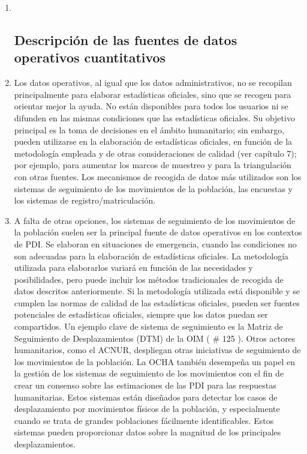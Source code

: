 \documentclass[
]{book}
\begin{document}
\begin{enumerate}
\def\labelenumi{\arabic{enumi}.}
\item ~
  \hypertarget{descripciuxf3n-de-las-fuentes-de-datos-operativos-cuantitativos}{%
  \subsection{Descripción de las fuentes de datos operativos cuantitativos}\label{descripciuxf3n-de-las-fuentes-de-datos-operativos-cuantitativos}}
\item
  Los datos operativos, al igual que los datos administrativos, no se recopilan principalmente para elaborar estadísticas oficiales, sino que se recogen para orientar mejor la ayuda. No están disponibles para todos los usuarios ni se difunden en las mismas condiciones que las estadísticas oficiales. Su objetivo principal es la toma de decisiones en el ámbito humanitario; sin embargo, pueden utilizarse en la elaboración de estadísticas oficiales, en función de la metodología empleada y de otras consideraciones de calidad (ver capítulo 7); por ejemplo, para aumentar los marcos de muestreo y para la triangulación con otras fuentes. Los mecanismos de recogida de datos más utilizados son los sistemas de seguimiento de los movimientos de la población, las encuestas y los sistemas de registro/matriculación.
\item
  A falta de otras opciones, los sistemas de seguimiento de los movimientos de la población suelen ser la principal fuente de datos operativos en los contextos de PDI. Se elaboran en situaciones de emergencia, cuando las condiciones no son adecuadas para la elaboración de estadísticas oficiales. La metodología utilizada para elaborarlos variará en función de las necesidades y posibilidades, pero puede incluir los métodos tradicionales de recogida de datos descritos anteriormente. Si la metodología utilizada está disponible y se cumplen las normas de calidad de las estadísticas oficiales, pueden ser fuentes potenciales de estadísticas oficiales, siempre que los datos puedan ser compartidos. Un ejemplo clave de sistema de seguimiento es la Matriz de Seguimiento de Desplazamientos (DTM) de la OIM (
  \# 125
  ). Otros actores humanitarios, como el ACNUR, despliegan otras iniciativas de seguimiento de los movimientos de la población. La OCHA también desempeña un papel en la gestión de los sistemas de seguimiento de los movimientos con el fin de crear un consenso sobre las estimaciones de las PDI para las respuestas humanitarias. Estos sistemas están diseñados para detectar los casos de desplazamiento por movimientos físicos de la población, y especialmente cuando se trata de grandes poblaciones fácilmente identificables. Estos sistemas pueden proporcionar datos sobre la magnitud de los principales desplazamientos.

\end{enumerate}
\end{document}

